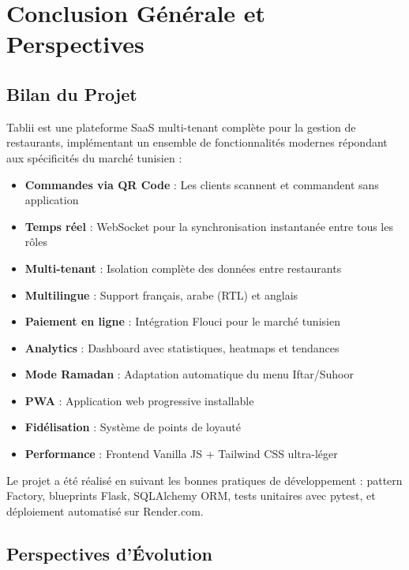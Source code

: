 \documentclass[12pt,a4paper]{report}
\begin{document}
\cleardoublepage
\chapter*{Conclusion Générale et Perspectives}

\section*{Bilan du Projet}

Tablii est une plateforme SaaS multi-tenant complète pour la gestion de restaurants, implémentant un ensemble de fonctionnalités modernes répondant aux spécificités du marché tunisien :

\begin{itemize}[leftmargin=1.5cm, itemsep=0.3cm]
    \item \textbf{Commandes via QR Code} : Les clients scannent et commandent sans application
    \item \textbf{Temps réel} : WebSocket pour la synchronisation instantanée entre tous les rôles
    \item \textbf{Multi-tenant} : Isolation complète des données entre restaurants
    \item \textbf{Multilingue} : Support français, arabe (RTL) et anglais
    \item \textbf{Paiement en ligne} : Intégration Flouci pour le marché tunisien
    \item \textbf{Analytics} : Dashboard avec statistiques, heatmaps et tendances
    \item \textbf{Mode Ramadan} : Adaptation automatique du menu Iftar/Suhoor
    \item \textbf{PWA} : Application web progressive installable
    \item \textbf{Fidélisation} : Système de points de loyauté
    \item \textbf{Performance} : Frontend Vanilla JS + Tailwind CSS ultra-léger
\end{itemize}

Le projet a été réalisé en suivant les bonnes pratiques de développement : pattern Factory, blueprints Flask, SQLAlchemy ORM, tests unitaires avec pytest, et déploiement automatisé sur Render.com.

\section*{Perspectives d'Évolution}
\end{document}
